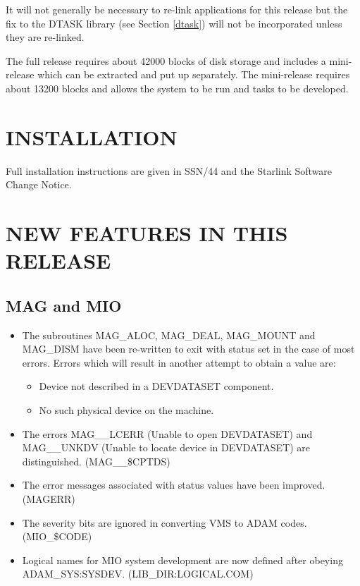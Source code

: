 It will not generally be necessary to re-link applications for this release but
the fix to the DTASK library (see Section \ref{dtask}) will not be incorporated
unless they are re-linked.

The full release requires about 42000 blocks of disk storage and includes a
mini-release which can be extracted and put up separately.
The mini-release requires about 13200 blocks and allows the system to be run
and tasks to be developed.

\section{INSTALLATION}
Full installation instructions are given in SSN/44 and the Starlink Software 
Change Notice.

\section{NEW FEATURES IN THIS RELEASE}

\subsection{MAG and MIO}
\label{mag}
\begin{itemize}
\item The subroutines MAG\_ALOC, MAG\_DEAL, MAG\_MOUNT and MAG\_DISM have been 
re-written to exit with status set in the case of most errors.
Errors which will result in another attempt to obtain a value are:
\begin{itemize}
\item Device not described in a DEVDATASET component.
\item No such physical device on the machine.
\end{itemize}

\item The errors MAG\_\_LCERR (Unable to open DEVDATASET) and MAG\_\_UNKDV
(Unable to locate device in DEVDATASET) are distinguished. (MAG\_\_\$CPTDS)

\item The error messages associated with status values have been improved.
(MAGERR)

\item The severity bits are ignored in converting VMS to ADAM codes. 
(MIO\_\$CODE)

\item Logical names for MIO system development are now defined after obeying
ADAM\_SYS:SYSDEV. (LIB\_DIR:LOGICAL.COM)
\end{itemize}

